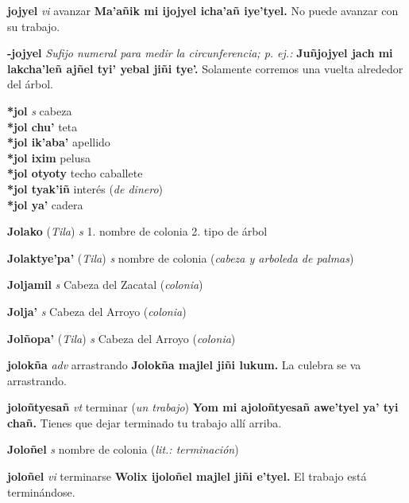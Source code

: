 \documentclass[10pt]{scrbook}
\newcommand{\entry}[1]{\textbf{#1}}
\newcommand{\onedefinition}[1]{#1.}
\newcommand{\nontranslationdef}[1]{\textit{#1}}
\newcommand{\partofspeech}[1]{\textit{#1}}
\newcommand{\spanishtranslation}[1]{#1}
\newcommand{\clarification}[1]{(\textit{#1})}
\newcommand{\cholexample}[1]{\textbf{#1}}
\newcommand{\exampletranslation}[1]{#1}
\newcommand{\relevantdialect}[1]{(\textit{#1})}
\newcommand{\secondaryentry}[1]{\\\textbf{#1}}
\newcommand{\secondtranslation}[1]{#1}
\begin{document}
\begin{multicols}{2}
\entry{jojyel}
\partofspeech{vi}
\spanishtranslation{avanzar}
\cholexample{Ma'añik mi ijojyel icha'añ iye'tyel.}
\exampletranslation{No puede avanzar con su trabajo.}

\entry{-jojyel}
\nontranslationdef{Sufijo numeral para medir la circunferencia; p. ej.:}
\cholexample{Juñjojyel jach mi lakcha'leñ ajñel tyi' yebal jiñi tye'.}
\exampletranslation{Solamente corremos una vuelta alrededor del árbol.}

\entry{*jol}
\partofspeech{s}
\spanishtranslation{cabeza}
\secondaryentry{*jol chu'}
\secondtranslation{teta}
\secondaryentry{*jol ik'aba'}
\secondtranslation{apellido}
\secondaryentry{*jol ixim}
\secondtranslation{pelusa}
\secondaryentry{*jol otyoty}
\secondtranslation{techo}
\secondtranslation{caballete}
\secondaryentry{*jol tyak'iñ}
\secondtranslation{interés}
\clarification{de dinero}
\secondaryentry{*jol ya'}
\secondtranslation{cadera}

\entry{Jolako}
\relevantdialect{Tila}
\partofspeech{s}
\onedefinition{1}
\spanishtranslation{nombre de colonia}
\onedefinition{2}
\spanishtranslation{tipo de árbol}

\entry{Jolaktye'pa'}
\relevantdialect{Tila}
\partofspeech{s}
\secondtranslation{nombre de colonia}
\clarification{cabeza y arboleda de palmas}

\entry{Joljamil}
\partofspeech{s}
\spanishtranslation{Cabeza del Zacatal}
\clarification{colonia}

\entry{Jolja'}
\partofspeech{s}
\spanishtranslation{Cabeza del Arroyo}
\clarification{colonia}

\entry{Jolñopa'}
\relevantdialect{Tila}
\partofspeech{s}
\spanishtranslation{Cabeza del Arroyo}
\clarification{colonia}

\entry{jolokña}
\partofspeech{adv}
\spanishtranslation{arrastrando}
\cholexample{Jolokña majlel jiñi lukum.}
\exampletranslation{La culebra se va arrastrando.}

\entry{joloñtyesañ}
\partofspeech{vt}
\spanishtranslation{terminar}
\clarification{un trabajo}
\cholexample{Yom mi ajoloñtyesañ awe'tyel ya' tyi chañ.}
\exampletranslation{Tienes que dejar terminado tu trabajo allí arriba.}

\entry{Joloñel}
\partofspeech{s}
\spanishtranslation{nombre de colonia}
\clarification{lit.: terminación}

\entry{joloñel}
\partofspeech{vi}
\spanishtranslation{terminarse}
\cholexample{Wolix ijoloñel majlel jiñi e'tyel.}
\exampletranslation{El trabajo está terminándose.}


\end{multicols}
\end{document}
